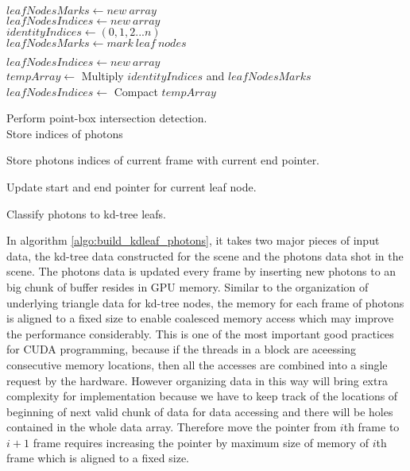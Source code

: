 \begin{algorithm}[H]
	\SetAlgoLined

	\( leafNodesMarks \leftarrow new\ array  \) \\
	\( leafNodesIndices \leftarrow new\ array  \) \\
	\( identityIndices \leftarrow (0, 1, 2 ... n) \) \\ 

	 {
		\( leafNodesMarks \leftarrow mark\ leaf\ nodes  \) \\
	}

	\( leafNodesIndices \leftarrow new\ array  \) \\
	\(tempArray \leftarrow \) Multiply \(identityIndices\) and \(leafNodesMarks\)
	\( leafNodesIndices \leftarrow \) Compact \( tempArray \)
	 
	 {
		 {
			Perform point-box intersection detection. \\ 
			Store indices of photons 
		}
	}
	
	 {
		 {
			Store photons indices of current frame with current end pointer. 
		}

		Update start and end pointer for current leaf node.
	}
	
	\caption{Classify photons to kd-tree leafs. } 	
	\label{algo:build_kdleaf_photons} 
\end{algorithm}

 \vspace{20pt}

In algorithm \ref{algo:build_kdleaf_photons}, it takes two major pieces of input data, the kd-tree data constructed for the scene and the photons data shot in the scene. The photons data is updated every frame by inserting new photons to an big chunk of buffer resides in GPU memory. Similar to the organization of underlying triangle data for kd-tree nodes, the memory for each frame of photons is aligned to a fixed size to enable coalesced memory access which may improve the performance considerably. This is one of the most important good practices for CUDA programming, because if the threads in a block are aceessing consecutive memory locations, then all the accesses are combined into a single request by the hardware. However organizing data in this way will bring extra complexity for implementation because we have to keep track of the locations of beginning of next valid chunk of data for data accessing and there will be holes contained in the whole data array. Therefore move the pointer from \(i\)th frame to \(i+1\) frame requires increasing the pointer by maximum size of memory of \(i\)th frame which is aligned to a fixed size. 

